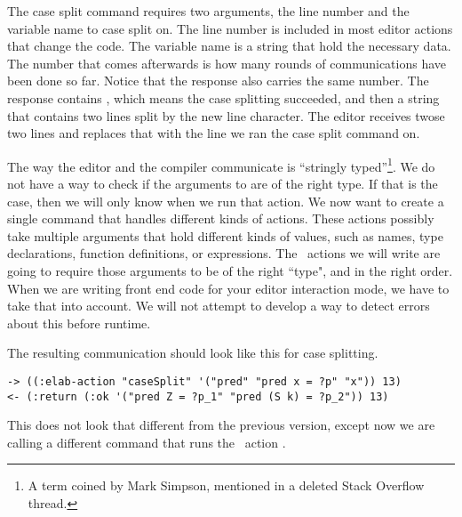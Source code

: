 The case split command requires two arguments, the line number and the variable
name to case split on. The line number is included in most editor actions that
change the code. The variable name is a string that hold the necessary data.
The number  that comes afterwards is how many rounds of communications
have been done so far. Notice that the response also carries the same number.
The response contains , which means the case splitting succeeded,
and then a string that contains two lines split by the new line character.
The editor receives twose two lines and replaces that with the line we ran the
case split command on.

The way the editor and the compiler communicate is
``stringly typed''\footnote{A term coined by Mark Simpson, mentioned in a
deleted Stack Overflow thread.}. We do not have a way
to check if the arguments
to  are of the right type. If that is the case, then we will
only know when we run that action.
We now want to create a single command that handles different kinds of
actions. These actions possibly take multiple arguments that hold different
kinds of values, such as names, type declarations, function definitions, or
expressions. The \Elab\ actions we will write are going to require those arguments
to be of the right ``type", and in the right order. When we are writing front
end code for your editor interaction mode, we have to take that into account.
We will not attempt to develop a way to detect errors about this before
runtime.

The resulting communication should look like this for case splitting.

\begin{Verbatim}[framesep=2mm, label=\footnotesize{\normalfont{S-expression}}, labelposition=topline]
-> ((:elab-action "caseSplit" '("pred" "pred x = ?p" "x")) 13)
<- (:return (:ok '("pred Z = ?p_1" "pred (S k) = ?p_2")) 13)
\end{Verbatim}

This does not look that different from the previous version, except now we are
calling a different command that runs the \Elab\ action .

